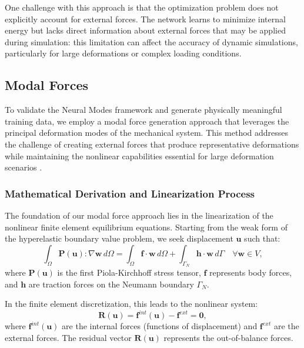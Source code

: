 One challenge with this approach is that the optimization problem does not explicitly account for external forces. The network learns to minimize internal energy but lacks direct information about external forces that may be applied during simulation: this limitation can affect the accuracy of dynamic simulations, particularly for large deformations or complex loading conditions.



\subsection{Modal Forces}

To validate the Neural Modes framework and generate physically meaningful training data, we employ a modal force generation approach that leverages the principal deformation modes of the mechanical system. This method addresses the challenge of creating external forces that produce representative deformations while maintaining the nonlinear capabilities essential for large deformation scenarios \cite{odotDeepPhysicsPhysicsAware2021}.

\subsubsection{Mathematical Derivation and Linearization Process}

The foundation of our modal force approach lies in the linearization of the nonlinear finite element equilibrium equations. Starting from the weak form of the hyperelastic boundary value problem, we seek displacement $\bm{u}$ such that:
\begin{equation}
    \int_{\Omega} \bm{P}(\bm{u}) : \nabla \bm{w} \, d\Omega = \int_{\Omega} \bm{f} \cdot \bm{w} \, d\Omega + \int_{\Gamma_N} \bm{h} \cdot \bm{w} \, d\Gamma \quad \forall \bm{w} \in V,
\end{equation}
where $\bm{P}(\bm{u})$ is the first Piola-Kirchhoff stress tensor, $\bm{f}$ represents body forces, and $\bm{h}$ are traction forces on the Neumann boundary $\Gamma_N$.

In the finite element discretization, this leads to the nonlinear system:
\begin{equation}
    \bm{R}(\bm{u}) = \bm{f}^{int}(\bm{u}) - \bm{f}^{ext} = \bm{0},
\end{equation}
where $\bm{f}^{int}(\bm{u})$ are the internal forces (functions of displacement) and $\bm{f}^{ext}$ are the external forces. The residual vector $\bm{R}(\bm{u})$ represents the out-of-balance forces.

